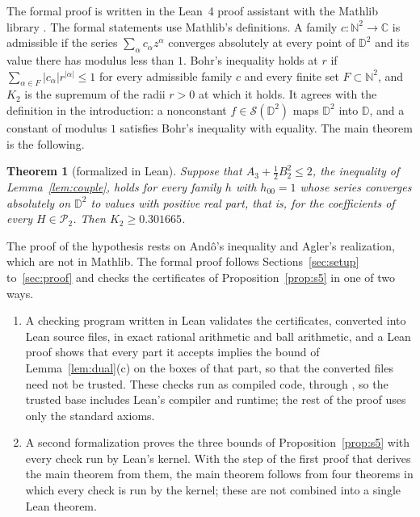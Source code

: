 \documentclass[11pt]{amsart}
\newtheorem{theorem}{Theorem}[section]
\theoremstyle{remark}
\numberwithin{equation}{section}
\newcommand{\C}{\mathbb{C}}
\newcommand{\D}{\mathbb{D}}
\newcommand{\Pclass}{\mathcal{P}_2}
\newcommand{\Kbound}{0.301665}
\newcommand{\lean}[1]{\texttt{\detokenize{#1}}}
\begin{document}
The formal proof is written in the Lean~4 proof assistant \cite{Lean4} with the Mathlib library \cite{Mathlib}. The formal statements use Mathlib's definitions. A family $c\colon\mathbb N^2\to\C$ is admissible if the series $\sum_\alpha c_\alpha z^\alpha$ converges absolutely at every point of $\D^2$ and its value there has modulus less than $1$. Bohr's inequality holds at $r$ if $\sum_{\alpha\in F}|c_\alpha|r^{|\alpha|}\le1$ for every admissible family $c$ and every finite set $F\subset\mathbb N^2$, and $K_2$ is the supremum of the radii $r>0$ at which it holds. It agrees with the definition in the introduction: a nonconstant $f\in\mathcal S(\D^2)$ maps $\D^2$ into $\D$, and a constant of modulus $1$ satisfies Bohr's inequality with equality. The main theorem is the following.
\begin{theorem}[formalized in Lean]\label{thm:formal}
Suppose that $A_3+\tfrac12B_2^2\le2$, the inequality of Lemma~\ref{lem:couple}, holds for every family $h$ with $h_{00}=1$ whose series converges absolutely on $\D^2$ to values with positive real part, that is, for the coefficients of every $H\in\Pclass$. Then $K_2\ge\Kbound$.
\end{theorem}
The proof of the hypothesis rests on And\^o's inequality and Agler's realization, which are not in Mathlib. The formal proof follows Sections~\ref{sec:setup} to~\ref{sec:proof} and checks the certificates of Proposition~\ref{prop:s5} in one of two ways.
\begin{enumerate}[label=(\arabic*),leftmargin=*]
\item A checking program written in Lean validates the certificates, converted into Lean source files, in exact rational arithmetic and ball arithmetic, and a Lean proof shows that every part it accepts implies the bound of Lemma~\ref{lem:dual}(c) on the boxes of that part, so that the converted files need not be trusted. These checks run as compiled code, through \lean{native_decide}, so the trusted base includes Lean's compiler and runtime; the rest of the proof uses only the standard axioms.
\item A second formalization proves the three bounds of Proposition~\ref{prop:s5} with every check run by Lean's kernel. With the step of the first proof that derives the main theorem from them, the main theorem follows from four theorems in which every check is run by the kernel; these are not combined into a single Lean theorem.
\end{enumerate}
\end{document}
